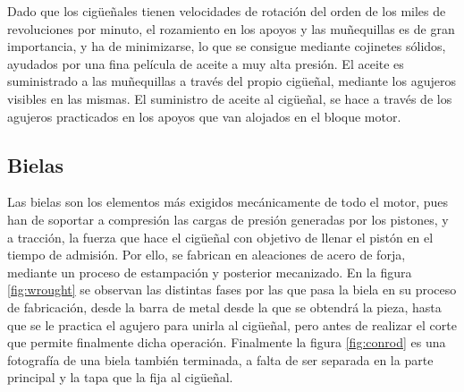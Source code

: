 Dado que los cigüeñales tienen velocidades de rotación del orden de los miles de revoluciones por minuto, el rozamiento en los apoyos y las muñequillas es de gran importancia, y ha de minimizarse, lo que se consigue mediante cojinetes sólidos, ayudados por una fina película de aceite a muy alta presión. El aceite es suministrado a las muñequillas a través del propio cigüeñal, mediante los agujeros visibles en las mismas. El suministro de aceite al cigüeñal, se hace a través de los agujeros practicados en los apoyos que van alojados en el bloque motor.


\subsection{Bielas} \label{ss:conrod}

Las bielas son los elementos más exigidos mecánicamente de todo el motor, pues han de soportar a compresión las cargas de presión generadas por los pistones, y a tracción, la fuerza que hace el cigüeñal con objetivo de llenar el pistón en el tiempo de admisión. Por ello, se fabrican en aleaciones de acero de forja, mediante un proceso de estampación y posterior mecanizado. En la figura \ref{fig:wrought} se observan las distintas fases por las que pasa la biela en su proceso de fabricación, desde la barra de metal desde la que se obtendrá la pieza, hasta que se le practica el agujero para unirla al cigüeñal, pero antes de realizar el corte que permite finalmente dicha operación. Finalmente la figura \ref{fig:conrod} es una fotografía de una biela también terminada, a falta de ser separada en la parte principal y la tapa que la fija al cigüeñal.


